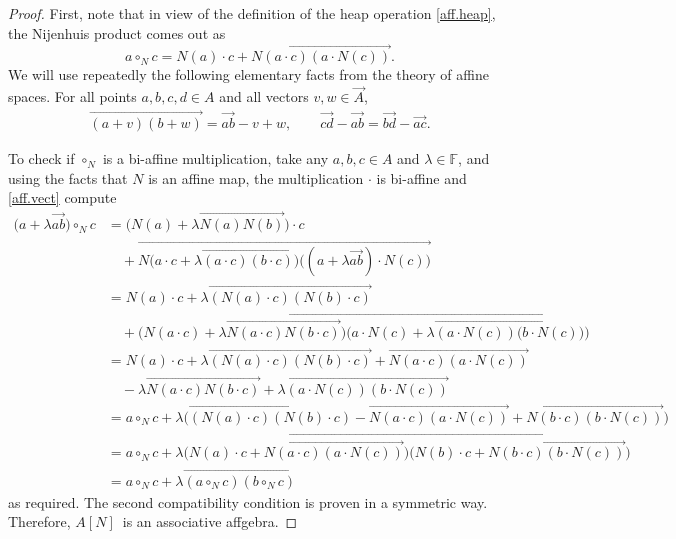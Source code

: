\documentclass[10pt,a4paper]{amsart}
\numberwithin{equation}{section}
\newcommand{\F}{\mathbb F}
\begin{document}
\begin{proof}
First, note that in view of the definition of the heap operation \eqref{aff.heap}, the Nijenhuis product comes out as
\[
a\circ_Nc = N(a)\cdot c + \overrightarrow{N(a\cdot c)(a\cdot N(c))}.
\]
 We will use repeatedly the following elementary facts from the theory of affine spaces. For all points $a,b,c,d\in A$ and all vectors $v,w\in \vec{A}$,
 \begin{gather}\label{aff.vect}
 \overrightarrow{(a+v)(b+w)} = \overrightarrow{ab}-v +w, \qquad \overrightarrow{cd} - \overrightarrow{ab} = \overrightarrow{bd} - \overrightarrow{ac} .
 \end{gather}

To check if $\circ_N$ is a bi-affine multiplication, take any $a,b,c\in A$ and $\lambda\in \F$, and using the facts that $N$ is an affine map, the multiplication $\cdot$ is bi-affine and \eqref{aff.vect} compute
\begin{align*}
 \bigl(a+\lambda \overrightarrow{ab}\bigr)\circ_N  c &= \bigl(N(a) + \lambda\overrightarrow{N(a)N(b)}\bigr)\cdot c
 \\
 &\quad+\overrightarrow{N\big(a\cdot c+\lambda\overrightarrow{(a\cdot c)(b\cdot c)}\big)\big((a+\lambda \overrightarrow{ab})\cdot N(c)\big)}\\
 &= N(a)\cdot c + \lambda \overrightarrow{(N(a)\cdot c)(N(b)\cdot c)} \\
 &\quad
 +
 \overrightarrow{\big(N(a\cdot c)+\lambda \overrightarrow{N(a\cdot c)N(b\cdot c)}\big)\big(a\cdot N(c)+\lambda \overrightarrow{(a\cdot N(c))(b\cdot N(c)})\big)}\\
 &= N(a)\cdot c + \lambda \overrightarrow{(N(a)\cdot c)(N(b)\cdot c)} + \overrightarrow{N(a\cdot c)(a\cdot N(c))}\\
 &\quad - \lambda \overrightarrow{N(a\cdot c)N(b\cdot c)} +
 \lambda \overrightarrow{(a\cdot N(c))(b\cdot N(c))}\\
 &= a\circ_N c+ \lambda \big(\overrightarrow{(N(a)\cdot c)(N(b)\cdot c)} - \overrightarrow{N(a\cdot c)(a\cdot N(c))} +
 \overrightarrow{N(b\cdot c)(b\cdot N(c))}\big)\\
 &= a\circ_N c + \lambda \overrightarrow{\big(N(a)\cdot c+ \overrightarrow{ N(a\cdot c)(a\cdot N(c))} \big)\big(N(b)\cdot c+
 \overrightarrow{N(b\cdot c)(b\cdot N(c))}\big)}\\
 &= a\circ_N c + \lambda \overrightarrow{(a\circ_N c)(b\circ_N c)}
\end{align*}
as required. The second compatibility condition is proven in a symmetric way. Therefore, $A[N]$~is an associative affgebra.


\end{proof}
\end{document}
